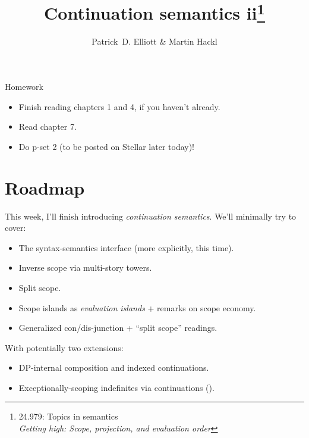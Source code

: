 \documentclass[nols,twoside,nofonts,nobib,nohyper]{tufte-handout}
\title{Continuation semantics ii\thanks{24.979: Topics in
    semantics\\\noindent\textit{Getting high: Scope, projection, and evaluation order}}}
\author[Patrick D. Elliott and Martin Hackl]{Patrick~D. Elliott\sidenote{\texttt{pdell@mit.edu}} \& Martin Hackl\sidenote{\texttt{hackl@mit.edu}}}
\begin{document}
\maketitle%

\begin{tcolorbox}
Homework
\tcblower
\begin{itemize}
\item Finish reading \cite{barkerShan2015} chapters 1 and 4, if you haven't already.
\item Read \cite{barkerShan2015} chapter 7.
\item Do p-set 2 (to be posted on Stellar later today)!
\end{itemize}
\end{tcolorbox}

\section{Roadmap}

This week, I'll finish introducing \textit{continuation semantics}. We'll
minimally try to cover:

\begin{itemize}

    \item The syntax-semantics interface (more explicitly, this time).

    \item Inverse scope via multi-story towers.

    \item Split scope.

    \item Scope islands as \textit{evaluation islands} + remarks on scope economy.

    \item Generalized con/dis-junction + \enquote{split scope} readings.

\end{itemize}

With potentially two extensions:

\begin{itemize}

    \item DP-internal composition and indexed continuations.

    \item Exceptionally-scoping indefinites via continuations (\citealt{Charlowc}).

\end{itemize}
\end{document}
